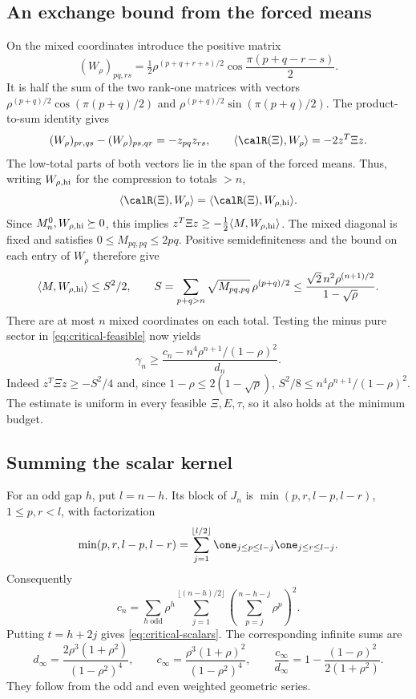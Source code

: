 \subsection{An exchange bound from the forced means}
On the mixed coordinates introduce the positive matrix
\[
 (W_\rho)_{pq,rs}=\tfrac12\rho^{(p+q+r+s)/2}
                  \cos\frac{\pi(p+q-r-s)}2.
\]
It is half the sum of the two rank-one matrices with vectors
$\rho^{(p+q)/2}\cos(\pi(p+q)/2)$ and $\rho^{(p+q)/2}\sin(\pi(p+q)/2)$.
The product-to-sum identity gives
\[
 (W_\rho)_{pr,qs}-(W_\rho)_{ps,qr}=-z_{pq}z_{rs},\qquad
 \langle\calR(\Xi),W_\rho\rangle=-2z^T\Xi z.
\]
The low-total parts of both vectors lie in the span of the forced
means. Thus, writing $W_{\rho,\rm hi}$ for the compression to totals $>n$,
\[
 \langle\calR(\Xi),W_\rho\rangle=\langle\calR(\Xi),W_{\rho,\rm hi}\rangle.
\]
Since $M_n^0,W_{\rho,\rm hi}\succeq0$, this implies
$z^T\Xi z\ge-\tfrac12\langle M,W_{\rho,\rm hi}\rangle$.
The mixed diagonal is fixed and satisfies $0\le M_{pq,pq}\le2pq$.
Positive semidefiniteness and the bound on each entry of $W_\rho$ therefore
give
\[
 \langle M,W_{\rho,\rm hi}\rangle\le S^2/2,\qquad
 S=\sum_{p+q>n}\sqrt{M_{pq,pq}}\,\rho^{(p+q)/2}
          \le\frac{\sqrt2\,n^2\rho^{(n+1)/2}}{1-\sqrt\rho}.
\]
There are at most $n$ mixed coordinates on each total. Testing the minus
pure sector in \eqref{eq:critical-feasible} now yields
\begin{equation}\label{eq:rational-lower}
 \gamma_n\ge
 \frac{c_n-n^4\rho^{n+1}/(1-\rho)^2}{d_n}.
\end{equation}
Indeed $z^T\Xi z\ge-S^2/4$ and, since $1-\rho\le2(1-\sqrt\rho)$,
$S^2/8\le n^4\rho^{n+1}/(1-\rho)^2$.
The estimate is uniform in every feasible $\Xi,E,\tau$, so it also
holds at the minimum budget.

\subsection{Summing the scalar kernel}
For an odd gap $h$, put $l=n-h$. Its block of $J_n$ is
$\min(p,r,l-p,l-r)$, $1\le p,r<l$, with factorization
\[
 \min(p,r,l-p,l-r)=\sum_{j=1}^{\lfloor l/2\rfloor}
             \one_{j\le p\le l-j}\one_{j\le r\le l-j}.
\]
Consequently
\[
 c_n=\sum_{h\ \mathrm{odd}}\rho^h
       \sum_{j=1}^{\lfloor(n-h)/2\rfloor}
                    \left(\sum_{p=j}^{n-h-j}\rho^p\right)^2.
\]
Putting $t=h+2j$ gives \eqref{eq:critical-scalars}.
The corresponding infinite sums are
\begin{equation}\label{eq:critical-infinite}
 d_\infty=\frac{2\rho^3(1+\rho^2)}{(1-\rho^2)^4},\qquad
 c_\infty=\frac{\rho^3(1+\rho)^2}{(1-\rho^2)^4},\qquad
 \frac{c_\infty}{d_\infty}
       =1-\frac{(1-\rho)^2}{2(1+\rho^2)}.
\end{equation}
They follow from the odd and even weighted geometric series.

